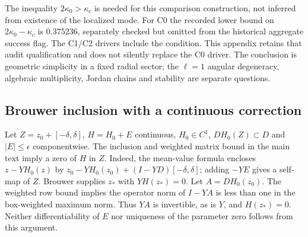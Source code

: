 The inequality $2\kappa_0>\kappa_c$ is needed for this comparison
construction, not inferred from existence of the localized mode.
For C0 the recorded lower bound on $2\kappa_0-\kappa_c$ is $0.375236$,
separately checked but omitted from the historical aggregate success
flag. The C1/C2 drivers include the condition. This appendix retains
that audit qualification and does not silently replace the C0 driver.
The conclusion is geometric simplicity in a fixed radial sector;
the $\ell=1$ angular degeneracy, algebraic multiplicity, Jordan chains
and stability are separate questions.

\subsection{Brouwer inclusion with a continuous correction}
Let $Z=z_0+[-\delta,\delta]$, $H=H_0+E$ continuous, $H_0\in C^1$,
$DH_0(Z)\subset D$ and $|E|\leq\epsilon$ componentwise. The inclusion
and weighted matrix bound in the main text imply a zero of $H$ in $Z$.
Indeed, the mean-value formula encloses $z-YH_0(z)$ by
$z_0-YH_0(z_0)+(I-YD)[-\delta,\delta]$; adding $-YE$ gives a
self-map of $Z$. Brouwer supplies $z_*$ with $YH(z_*)=0$.
Let $A=DH_0(z_0)$. The weighted row bound implies the operator norm of
$I-YA$ is less than one in the box-weighted maximum norm. Thus $YA$
is invertible, as is $Y$, and $H(z_*)=0$. Neither differentiability
of $E$ nor uniqueness of the parameter zero follows from this argument.
